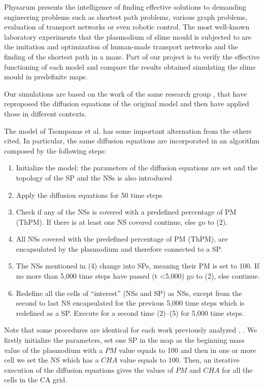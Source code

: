 \label{simulations}

Physarum presents the intelligence of finding effective solutions to demanding engineering problems such as shortest path problems, various graph problems, evaluation of transport networks or even robotic control.
The most well-known laboratory experiments that the plasmodium of slime mould is subjected to are the imitation and optimization of human-made transport networks and the finding of the shortest path in a maze.
Part of our project is to verify the effective functioning of each model and compare the results obtained simulating the slime mould in predefinite maps.

\par
Our simulations are based on the work of the same research group \cite{dourvas2016gpgpu}, \cite{tsompanas2015cellular} that have reproposed the diffusion equations of the original model \cite{Tsompanas2016} and then have applied those in different contexts.

\par
The model of Tsompanas et al. \cite{Tsompanas2016} has some important alternation from the others cited. In particular, the same diffusion equations are incorporated in an algorithm composed by the following steps:

\begin{enumerate}
	\item Initialize the model: the parameters of the diffusion equations are set and the topology of the SP and the NSs is also introduced
	\item Apply the diffusion equations for 50 time steps
	\item Check if any of the NSs is covered with a predefined percentage of PM (ThPM). If there is at least one NS covered continue, else go to (2).
	\item All NSs covered with the predefined percentage of PM (ThPM), are encapsulated by the plasmodium and therefore connected to a SP.
	\item The NSs mentioned in (4) change into SPs, meaning their PM is set to 100. If no more than 5,000 time steps have passed (t <5,000) go to (2), else continue.
	\item Redefine all the cells of “interest” (NSs and SP) as NSs, except from the second to last NS encapsulated for the previous 5,000 time steps which is redefined as a SP. Execute for a second time (2)–(5) for 5,000 time steps.
\end{enumerate}

Note that some procedures are identical for each work previously analyzed \cite{dourvas2016gpgpu}, \cite{tsompanas2015cellular}. We firstly initialize the parameters, set one SP in the map as the beginning mass value of the plasmodium with a $PM$ value equals to 100 and then in one or more cell we set the NS which has a $CHA$ value equals to 100. Then, an iterative execution of the diffusion equations gives the values of $PM$ and $CHA$ for all the cells in the CA grid.

